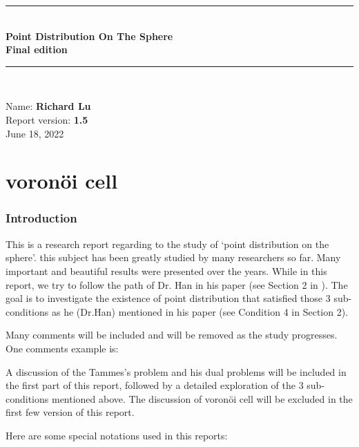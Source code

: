 \documentclass[12pt]{article}
\numberwithin{equation}{section}
\begin{document}
	
	\begin{titlepage}
		\hspace{0pt}
		\vfill
		\begin{tcolorbox}
			\begin{center}
				\rule{\textwidth}{1.5pt}\\[1mm]
				\LARGE{\textbf{Point Distribution On The Sphere}}\\[3mm]
				\large{\textbf{Final edition}}\\[1mm]
				\rule{\textwidth}{1.5pt}\\[1mm]
			\end{center}
		\end{tcolorbox}
		\vfill
		\begin{tcolorbox}
			\begin{center}
				\large{Name: \textbf{Richard Lu}}\\
				\large{Report version: \textbf{1.5}}\\
				June 18, 2022
			\end{center}
		\end{tcolorbox}
	\end{titlepage}
	\tableofcontents
	\thispagestyle{empty}
	\clearpage
	\setcounter{page}{1}

	\part{voronöi cell}
	
	\newpage
	\section{Introduction}
		This is a research report regarding to the study of `point distribution on the sphere'. this subject has been greatly studied by many researchers so far. Many important and beautiful results were presented over the years. While in this report, we try to follow the path of Dr. Han in his paper (see Section 2 in \cite{xiaolong_uniformly}
		).
		 The goal is to investigate the existence of  point distribution that satisfied those 3 sub-conditions as he (Dr.Han) mentioned in his paper (see Condition 4 in Section 2). \par
		 Many comments will be included and will be removed as the study progresses. One comments example is: 
		 
		 \vspace{10mm}
		\par
		A discussion of the Tammes's problem and his dual problems will be included in the first part of this report, followed by a detailed exploration of the 3 sub-conditions mentioned above. The discussion of voronöi cell will be excluded in the first few version of this report.\par
		Here are some special notations used in this reports:\\
		
\end{document}
